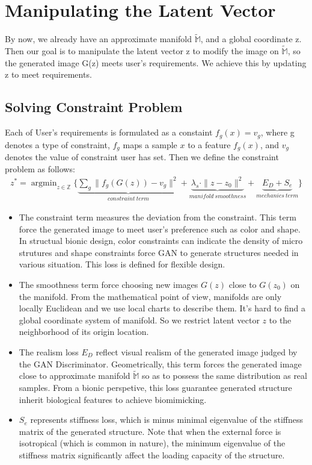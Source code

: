 \section{Manipulating the Latent Vector}
By now, we already have an approximate manifold $\widetilde{\mathbb{M}}$, and a global coordinate z. Then our goal is to manipulate the latent vector z to modify the image on $\widetilde{\mathbb{M}}$, so the generated image G(z) meets user’s requirements. We achieve this by updating z to meet requirements.

\subsection{Solving Constraint Problem}
Each of User's requirements is formulated as a constaint $f_g(x)=v_g$, where g denotes a type of constraint, $f_g$ maps a sample $x$ to a feature $f_g(x)$, and $v_g$ denotes the value of constraint user has set. Then we define the constraint problem as follows:
\begin{equation}
\begin{aligned}
z^* = \mathop{\arg\min}_{z \in \mathbb{Z}} \{\underbrace{\sum_{g}\|f_g(G(z))-v_g\|^2}_{constraint\ term} +\underbrace{\lambda_s\cdot\|z-z_0\|^2}_{manifold\ smoothness} + \underbrace{E_D + S_e}_{mechanics\ term} \}
\end{aligned}
\end{equation}
\begin{itemize}
\item The constraint term measures the deviation from the constraint. This term force the generated image to meet user's preference such as color and shape. In structual bionic design, color constraints can indicate the density of micro strutures and shape constraints force GAN to generate structures needed in various situation. This loss is defined for flexible design.

\item The smoothness term force choosing new images $G(z)$ close to $G(z_0)$ on the manifold. From the mathematical point of view, manifolds are only locally Euclidean and we use local charts to describe them. It's hard to find a global coordinate system of manifold. So we restrict latent vector $z$ to the neighborhood of its origin location. 

\item The realism loss $E_D$ reflect visual realism of the generated image judged by the GAN Discriminator. Geometrically, this term forces the generated image close to approximate manifold $\widetilde{\mathbb{M}}$ so as to possess the same distribution as real samples. From a bionic perspetive, this loss guarantee generated structure inherit biological features to achieve biomimicking.  

\item $S_{e}$ represents stiffness loss, which is minus minimal eigenvalue of the stiffness matrix of the generated structure. Note that when the external force is isotropical (which is common in nature), the minimum eigenvalue of the stiffness matrix significantly affect the loading capacity of the structure.
\end{itemize}

